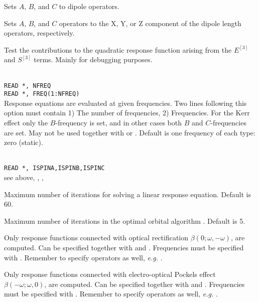 \begin{description}
\item{}
Sets $A$, $B$, and $C$ to dipole operators.

\item{}
Sets $A$, $B$, and $C$ operators to the X, Y, or Z component of the
dipole length operators, respectively.

\item{}
Test the contributions to the quadratic response function arising from
the $E^{\left[3\right]}$ and $S^{\left[3\right]}$ terms.  Mainly for
debugging purposes.

\item{}\\
\verb|READ *, NFREQ|\\
\verb|READ *, FREQ(1:NFREQ)|\\
Response equations are evaluated at given
frequencies. Two lines
following this option must contain 1) The number of frequencies, 2)
Frequencies.
For the Kerr effect only the $B$-frequency is set,
and in other cases both $B$ and $C$-frequencies are set.
May not be used together with  or .
Default is one frequency of each type: zero (static).

\item{}\\
\verb|READ *, ISPINA,ISPINB,ISPINC|\\
see above, , , 


\item{}
Maximum number of iterations for solving a linear response equation.
Default is 60.

\item{}
Maximum number of iterations in the optimal
orbital algorithm
\cite{tuhjahjajpjjcp84}.
Default is 5.

\item{}
Only response functions connected with optical rectification
$\beta(0; \omega,-\omega)$, are computed.
Can be specified together with  and .
Frequencies must be specified with .
Remember to specify operators as well, {\it e.g.\/} .

\item{}
Only response functions connected with electro-optical
Pockels effect
$\beta(-\omega; \omega,0)$, are computed.
Can be specified together with  and .
Frequencies must be specified with .
Remember to specify operators as well, {\it e.g.\/} .


\end{description}

